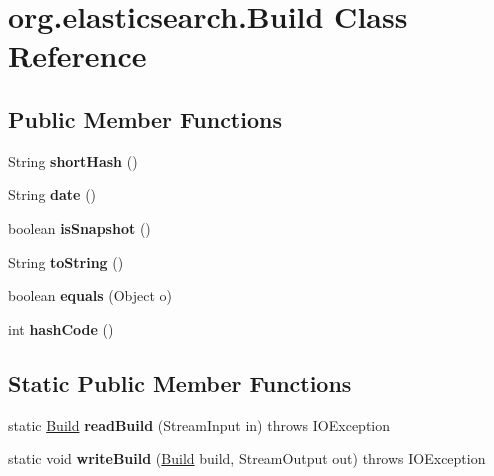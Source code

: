\hypertarget{classorg_1_1elasticsearch_1_1_build}{}\section{org.\+elasticsearch.\+Build Class Reference}
\label{classorg_1_1elasticsearch_1_1_build}
\subsection*{Public Member Functions}
\begin{DoxyCompactItemize}
\item 
\hypertarget{classorg_1_1elasticsearch_1_1_build_a14543155107b3d509f3c74ee5356d4bd}{}\label{classorg_1_1elasticsearch_1_1_build_a14543155107b3d509f3c74ee5356d4bd} 
String {\bfseries short\+Hash} ()
\item 
\hypertarget{classorg_1_1elasticsearch_1_1_build_a3b9f9888278e0a79c5426d9715687f1b}{}\label{classorg_1_1elasticsearch_1_1_build_a3b9f9888278e0a79c5426d9715687f1b} 
String {\bfseries date} ()
\item 
\hypertarget{classorg_1_1elasticsearch_1_1_build_ab596fcfab24a898e437a04b6709fc2ae}{}\label{classorg_1_1elasticsearch_1_1_build_ab596fcfab24a898e437a04b6709fc2ae} 
boolean {\bfseries is\+Snapshot} ()
\item 
\hypertarget{classorg_1_1elasticsearch_1_1_build_ab43b46422022f2e964a3eeecbae7a9f8}{}\label{classorg_1_1elasticsearch_1_1_build_ab43b46422022f2e964a3eeecbae7a9f8} 
String {\bfseries to\+String} ()
\item 
\hypertarget{classorg_1_1elasticsearch_1_1_build_af0f80b16de4a0db857f6c73915bee41b}{}\label{classorg_1_1elasticsearch_1_1_build_af0f80b16de4a0db857f6c73915bee41b} 
boolean {\bfseries equals} (Object o)
\item 
\hypertarget{classorg_1_1elasticsearch_1_1_build_ad080a58165e1321917a2e8c36bb2d9e9}{}\label{classorg_1_1elasticsearch_1_1_build_ad080a58165e1321917a2e8c36bb2d9e9} 
int {\bfseries hash\+Code} ()
\end{DoxyCompactItemize}
\subsection*{Static Public Member Functions}
\begin{DoxyCompactItemize}
\item 
\hypertarget{classorg_1_1elasticsearch_1_1_build_ae7cac28aaf369cbc3b671c469a255cec}{}\label{classorg_1_1elasticsearch_1_1_build_ae7cac28aaf369cbc3b671c469a255cec} 
static \hyperlink{classorg_1_1elasticsearch_1_1_build}{Build} {\bfseries read\+Build} (Stream\+Input in)  throws I\+O\+Exception 
\item 
\hypertarget{classorg_1_1elasticsearch_1_1_build_a5372085ee8a0c4e22d9cbafcde243628}{}\label{classorg_1_1elasticsearch_1_1_build_a5372085ee8a0c4e22d9cbafcde243628} 
static void {\bfseries write\+Build} (\hyperlink{classorg_1_1elasticsearch_1_1_build}{Build} build, Stream\+Output out)  throws I\+O\+Exception 
\end{DoxyCompactItemize}
